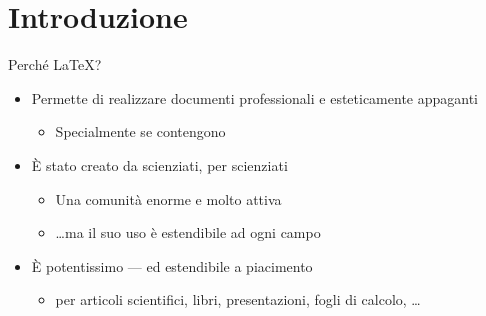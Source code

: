 \documentclass{beamer}
\subtitle{Parte 1: Le basi}
\begin{document}
\begin{frame}
\titlepage
\end{frame}

\section{Introduzione}
\begin{frame}{Perch\'e \LaTeX{}?}
\begin{itemize}
\item Permette di realizzare documenti professionali e esteticamente appaganti
\begin{itemize}
\item Specialmente se contengono 
\end{itemize}
%
\item \`E stato creato da scienziati, per scienziati
\begin{itemize}
\item Una comunit\`a enorme e molto attiva
\item \ldots ma il suo uso \`e estendibile ad ogni campo
\end{itemize}
%
\item \`E potentissimo --- ed estendibile a piacimento
\begin{itemize}
\item {} per articoli scientifici, libri, presentazioni,
fogli di calcolo, \ldots
\end{itemize}
\end{itemize}
\end{frame}
\end{document}
